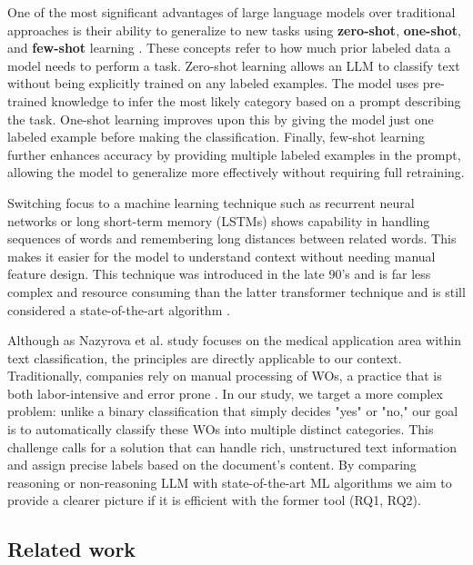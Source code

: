 One of the most significant advantages of large language models over traditional approaches is their ability to generalize to new tasks using \textbf{zero-shot}, \textbf{one-shot}, and \textbf{few-shot} learning \cite{brown2020language}. These concepts refer to how much prior labeled data a model needs to perform a task. Zero-shot learning allows an LLM to classify text without being explicitly trained on any labeled examples. The model uses pre-trained knowledge to infer the most likely category based on a prompt describing the task. One-shot learning improves upon this by giving the model just one labeled example before making the classification. Finally, few-shot learning further enhances accuracy by providing multiple labeled examples in the prompt, allowing the model to generalize more effectively without requiring full retraining.

Switching focus to a machine learning technique such as recurrent neural networks or long short-term memory (LSTMs) shows capability in handling sequences of words and remembering long distances between related words. This makes it easier for the model to understand context without needing manual feature design. This technique was introduced in the late 90's and is far less complex and resource consuming than the latter transformer technique and is still considered a state-of-the-art algorithm \cite{wang2024classifiers} \cite{hochreiter1997long}.

Although as Nazyrova et al. \cite{nazyrova2024medical} study focuses on the medical application area within text classification, the principles are directly applicable to our context.  Traditionally, companies rely on manual processing of WOs, a practice that is both labor-intensive and error prone \cite{li2024work}. In our study, we target a more complex problem: unlike a binary classification that simply decides "yes" or "no," our goal is to automatically classify these WOs into multiple distinct categories. This challenge calls for a solution that can handle rich, unstructured text information and assign precise labels based on the document’s content. By comparing reasoning or non-reasoning LLM with state-of-the-art ML algorithms we aim to provide a clearer picture if it is efficient with the former tool (RQ1, RQ2).

\subsection{Related work}


